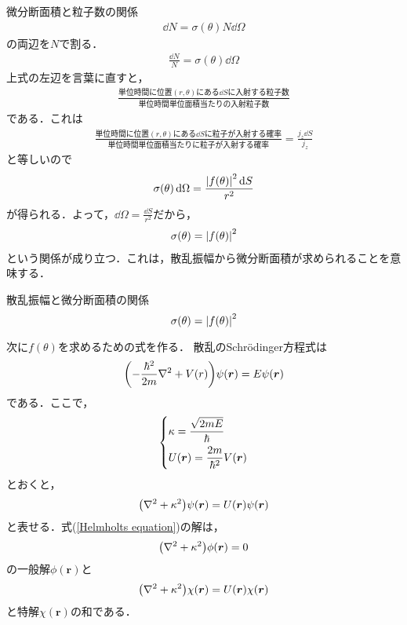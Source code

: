 \documentclass{report}
\begin{document}
  微分断面積と粒子数の関係
  \begin{align}
    \dd{N} = \sigma (\theta) N \dd{\Omega}
  \end{align}
  の両辺を$N$で割る．
  \begin{align}
    \frac{\dd{N}}{N} = \sigma (\theta) \dd{\Omega}
  \end{align}
  上式の左辺を言葉に直すと，
  \begin{align}
    \frac{\text{単位時間に位置$(r,\theta)$にある$\dd{S}$に入射する粒子数}}{\text{単位時間単位面積当たりの入射粒子数}}
  \end{align}
  である．これは
  \begin{align}
    \frac{\text{単位時間に位置$(r,\theta)$にある$\dd{S}$に粒子が入射する確率}}{\text{単位時間単位面積当たりに粒子が入射する確率}} = \frac{j_z \dd{S}}{j_z}
  \end{align}
  と等しいので
  \begin{align}
    \sigma(\theta)\dd{\Omega} = \frac{\abs{f(\theta)}^2\dd{S}}{r^2}
  \end{align}
  が得られる．よって，$\dd{\Omega} = \frac{\dd{S}}{r^2}$だから，
  \begin{align}
    \sigma(\theta) = \abs{f(\theta)}^2
  \end{align}
  という関係が成り立つ．これは，散乱振幅から微分断面積が求められることを意味する．
  \begin{itembox}[l]{散乱振幅と微分断面積の関係}
    \begin{equation}
      \sigma(\theta) = \abs{f(\theta)}^2
    \end{equation}
  \end{itembox}

  次に$f(\theta)$を求めるための式を作る．
  散乱のSchrödinger方程式は
  \begin{align}
    \qty(-\frac{\hbar^2}{2m}\nabla^2 + V(r))\psi(\bm{r}) = E\psi(\bm{r})
  \end{align}
  である．ここで，
  \begin{align}
    \begin{dcases}
      \kappa = \frac{\sqrt{2mE}}{\hbar}\\
      U(\bm{r}) = \frac{2m}{\hbar^2} V(\bm{r})
    \end{dcases}
  \end{align}
  とおくと，
  \begin{align}
    \label{Helmholtz equation}
    \qty(\nabla^2 + \kappa^2)\psi(\bm{r}) = U(\bm{r}) \psi(\bm{r})
  \end{align}
  と表せる．式(\ref{Helmholts equation})の解は，
  \begin{align}
    \qty(\nabla^2 + \kappa^2)\phi(\bm{r}) = 0
  \end{align}
  の一般解$\phi(\bm{r})$と
  \begin{align}
    \label{Tokkai}
    \qty(\nabla^2 + \kappa^2)\chi(\bm{r}) = U(\bm{r}) \chi(\bm{r})
  \end{align}
  と特解$\chi(\bm{r})$の和である．
  
\end{document}
